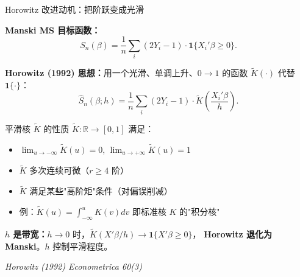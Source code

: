 \documentclass[aspectratio=169, 10pt]{beamer}
\begin{document}
\begin{frame}[shrink=10]{Horowitz 改进动机：把阶跃变成光滑}

  \textbf{Manski MS 目标函数：}
  $$S_n(\beta) = \frac{1}{n}\sum_i (2Y_i-1) \cdot \mathbf{1}\{X_i'\beta \geq 0\}.$$

  \textbf{Horowitz (1992) 思想：}用一个光滑、单调上升、$0 \to 1$ 的函数 $\tilde K(\cdot)$ 代替 $\mathbf{1}\{\cdot\}$：
  $$\hat S_n(\beta; h) = \frac{1}{n}\sum_i (2Y_i-1) \cdot \tilde K\!\left(\frac{X_i'\beta}{h}\right).$$

  \begin{definitionbox}{{平滑核 $\tilde K$ 的性质}}
    $\tilde K: \mathbb{R} \to [0, 1]$ 满足：
    \begin{itemize}\setlength{\itemsep}{1pt}
      \item $\lim_{u \to -\infty} \tilde K(u) = 0$, $\lim_{u \to +\infty} \tilde K(u) = 1$
      \item $\tilde K$ 多次连续可微（$r \geq 4$ 阶）
      \item $\tilde K$ 满足某些"高阶矩"条件（对偏误削减）
      \item 例：$\tilde K(u) = \int_{-\infty}^u K(v) dv$ 即标准核 $K$ 的"积分核"
    \end{itemize}
  \end{definitionbox}

  \begin{keybox}
    \textbf{$h$ 是带宽：}$h \to 0$ 时，$\tilde K(X'\beta/h) \to \mathbf{1}\{X'\beta \geq 0\}$，
    \textbf{Horowitz 退化为 Manski}。$h$ 控制平滑程度。
  \end{keybox}

  \hfill{\scriptsize\textit{Horowitz (1992) Econometrica 60(3)}}

\end{frame}
\end{document}
